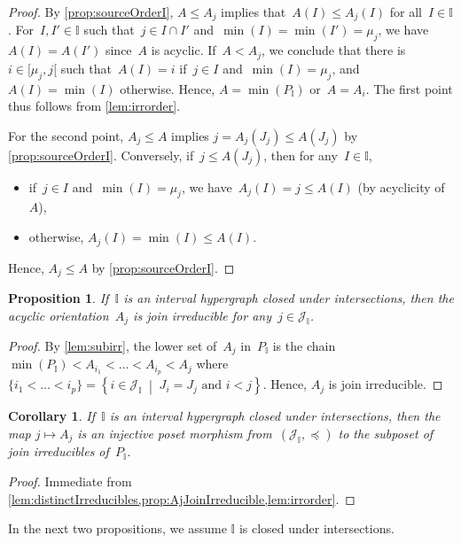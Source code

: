 \documentclass{amsart}
\newtheorem{corollary}[theorem]{Corollary}
\newtheorem{proposition}[theorem]{Proposition}
\theoremstyle{definition}
\newcommand{\cal}[1]{\mathcal{#1}} %
\newcommand{\set}[2]{\left\{ #1 \;\middle|\; #2 \right\}} %
\newcommand{\II}{\mathbb I} %
\newcommand{\cJ}{\cal{J}} %
\begin{document}
\begin{proof}
By \cref{prop:sourceOrderI}, $A \le A_j$ implies that~$A(I) \le A_j(I)$ for all~$I \in \II$.
For~$I, I' \in \II$ such that~$j \in I \cap I'$ and~$\min(I) = \min(I') = \mu_j$, we have~$A(I) = A(I')$ since~$A$ is acyclic.
If~$A < A_j$, we conclude that there is~$i \in {[\mu_j, j[}$ such that~$A(I) = i$ if~$j \in I$ and~$\min(I) = \mu_j$, and~$A(I) = \min(I)$ otherwise.
Hence, $A = \min(P_\II)$ or~$A = A_i$.
The first point thus follows from \cref{lem:irrorder}.

For the second point, $A_j \le A$ implies $j = A_j(J_j) \le A(J_j)$ by \cref{prop:sourceOrderI}.
Conversely, if~$j \le A(J_j)$, then for any~$I \in \II$,
\begin{itemize}
\item if~$j \in I$ and~$\min(I) = \mu_j$, we have~$A_j(I) = j \le A(I)$ (by acyclicity of~$A$),
\item otherwise, $A_j(I) = \min(I) \le A(I)$.
\end{itemize}
Hence, $A_j \le A$ by \cref{prop:sourceOrderI}.
\end{proof}

\begin{proposition}
\label{prop:AjJoinIrreducible}
If~$\II$ is an interval hypergraph closed under intersections, then the acyclic orientation~$A_j$ is join irreducible for any~$j\in \cJ_\II$.
\end{proposition}

\begin{proof}
By \cref{lem:subirr}, the lower set of~$A_j$ in~$P_\II$ is the chain $\min(P_\II) < A_{i_1} < \dots < A_{i_p} < A_j$ where~$\{i_1 < \dots < i_p\} = \set{i \in \cJ_\II}{J_i = J_j \text{ and } i < j}$.
Hence, $A_j$ is join irreducible.
\end{proof}

\begin{corollary}
\label{coro:irreduciblePosetMorphism}
If~$\II$ is an interval hypergraph closed under intersections, then the map $j \mapsto A_j$ is an injective poset morphism from~$(\cJ_\II, \preccurlyeq)$ to the subposet of join irreducibles of~$P_\II$.
\end{corollary}

\begin{proof}
Immediate from \cref{lem:distinctIrreducibles,prop:AjJoinIrreducible,lem:irrorder}.
\end{proof}

In the next two propositions, we assume $\II$ is closed under intersections.
\end{document}
